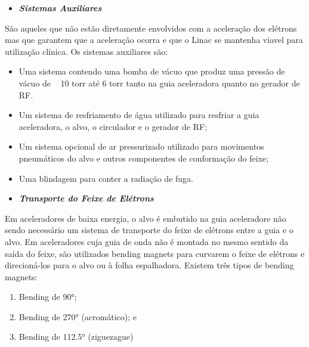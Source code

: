\documentclass[11pt,a4paper]{article}
\begin{document}
                \begin{itemize}
                    \item \textbf{\textit{\textcolor{CarnationPink}{Sistemas Auxiliares}}}
                \end{itemize}

                    São aqueles que não estão diretamente envolvidos com a aceleração dos elétrons mas que garantem que a aceleração ocorra e que o Linac se mantenha viavel para utilização clínica. Os sistemas auxiliares são:

                    \begin{itemize}
                        \item Uma sistema contendo uma bomba de vácuo que produz uma pressão de vácuo de ~ 10 torr até 6 torr tanto na guia aceleradora quanto no gerador de RF.
                        \item Um sistema de resfriamento de água utilizado para resfriar a guia aceleradora, o alvo, o circulador e o gerador de RF;
                        \item Um sistema opcional de ar pressurizado utilizado para movimentos pneumáticos do alvo e outros componentes de conformação do feixe;
                        \item Uma blindagem para conter a radiação de fuga.
                    \end{itemize}

                \begin{itemize}
                    \item \textbf{\textit{\textcolor{CarnationPink}{Transporte do Feixe de Elétrons}}}
                \end{itemize}

                    Em aceleradores de baixa energia, o alvo é embutido na guia aceleradore não sendo necessário um sistema de transporte do feixe de elétrons entre a guia e o alvo. Em aceleradores cuja guia de onda não é montada no mesmo sentido da saída do feixe, são utilizados bending magnets para curvarem o feixe de elétrons e direcioná-los para o alvo ou à folha espalhadora. Existem três tipos de bending magnets: 
                    
                        \begin{enumerate}
                            \item Bending de \ang{90};
                            \item Bending de \ang{270} (acromático); e
                            \item Bending de \ang{112.5} (ziguezague)
                        \end{enumerate}
\end{document}
